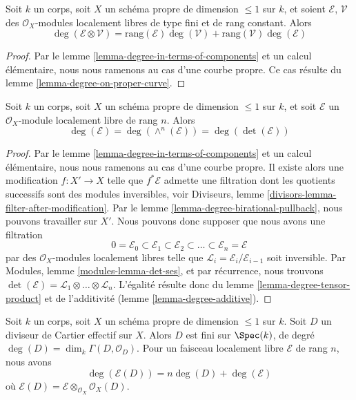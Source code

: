 \begin{lemma}
\label{lemma-degree-tensor-product}
Soit $k$ un corps, soit $X$ un schéma propre de dimension $\leq 1$
sur $k$, et soient $\mathcal{E}$, $\mathcal{V}$ des
$\mathcal{O}_X$-modules localement libres de type fini et de rang constant. Alors
$$
\deg(\mathcal{E} \otimes \mathcal{V}) =
\text{rang}(\mathcal{E}) \deg(\mathcal{V}) +
\text{rang}(\mathcal{V}) \deg(\mathcal{E})
$$
\end{lemma}

\begin{proof}
Par le lemme \ref{lemma-degree-in-terms-of-components} et un calcul
élémentaire, nous nous ramenons au cas d'une courbe propre.
Ce cas résulte du lemme \ref{lemma-degree-on-proper-curve}.
\end{proof}

\begin{lemma}
\label{lemma-degree-and-det}
Soit $k$ un corps, soit $X$ un schéma propre de dimension $\leq 1$
sur $k$, et soit $\mathcal{E}$ un
$\mathcal{O}_X$-module localement libre de rang $n$. Alors
$$
\deg(\mathcal{E}) = \deg(\wedge^n(\mathcal{E})) = \deg(\det(\mathcal{E}))
$$
\end{lemma}

\begin{proof}
Par le lemme \ref{lemma-degree-in-terms-of-components} et un calcul
élémentaire, nous nous ramenons au cas d'une courbe propre.
Il existe alors une modification $f : X' \to X$ telle que
$f^*\mathcal{E}$ admette une filtration dont les quotients
successifs sont des modules inversibles, voir
Diviseurs, lemme \ref{divisors-lemma-filter-after-modification}.
Par le lemme \ref{lemma-degree-birational-pullback}, nous pouvons travailler sur $X'$.
Nous pouvons donc supposer que nous avons une filtration
$$
0 = \mathcal{E}_0 \subset \mathcal{E}_1 \subset \mathcal{E}_2 \subset
\ldots \subset \mathcal{E}_n = \mathcal{E}
$$
par des $\mathcal{O}_X$-modules localement libres
telle que $\mathcal{L}_i = \mathcal{E}_i/\mathcal{E}_{i - 1}$ soit inversible.
Par Modules, lemme \ref{modules-lemma-det-ses}, et par récurrence, nous trouvons
$\det(\mathcal{E}) = \mathcal{L}_1 \otimes \ldots \otimes \mathcal{L}_n$.
L'égalité résulte donc du lemme \ref{lemma-degree-tensor-product}
et de l'additivité (lemme \ref{lemma-degree-additive}).
\end{proof}

\begin{lemma}
\label{lemma-degree-effective-Cartier-divisor}
Soit $k$ un corps, soit $X$ un schéma propre de dimension $\leq 1$
sur $k$. Soit $D$ un diviseur de Cartier effectif sur $X$.
Alors $D$ est fini sur $\Spec(k)$, de degré
$\deg(D) = \dim_k \Gamma(D, \mathcal{O}_D)$. Pour un faisceau localement libre
$\mathcal{E}$ de rang $n$, nous avons
$$
\deg(\mathcal{E}(D)) = n\deg(D) + \deg(\mathcal{E})
$$
où $\mathcal{E}(D) = \mathcal{E} \otimes_{\mathcal{O}_X} \mathcal{O}_X(D)$.
\end{lemma}

